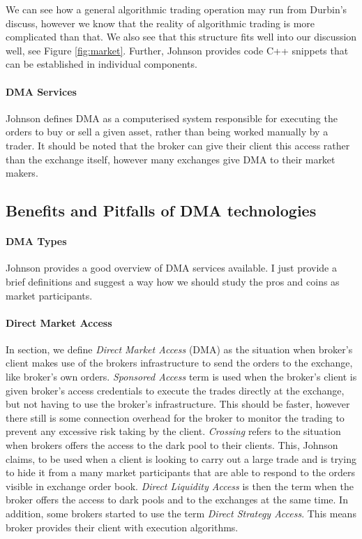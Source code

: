 \documentclass[12pt]{article}
\begin{document}
We can see how a general algorithmic trading operation may run from Durbin's discuss, however we know that the reality of algorithmic trading is more complicated than that. We also see that this structure fits well into our discussion well, see Figure \ref{fig:market}. Further, Johnson \cite{johnson} provides code C++ snippets that can be established in individual components.
\paragraph{DMA Services} Johnson \cite{johnson} defines DMA as a computerised system responsible for executing the orders to buy or sell a given asset, rather than being worked manually by a trader. It should be noted that the broker can give their client this access rather than the exchange itself, however many exchanges give DMA to their market makers.

\subsection*{Benefits and Pitfalls of DMA technologies}
\paragraph*{DMA Types} Johnson \cite{johnson} provides a good overview of DMA services available. I just provide a brief definitions and suggest a way how we should study the pros and coins as market participants.

\paragraph*{Direct Market Access} In section, we define \textit{Direct Market Access} (DMA) as the situation when broker's client makes use of the brokers infrastructure to send the orders to the exchange, like broker's own orders. \textit{Sponsored Access} term is used when the broker's client is given broker's access credentials to execute the trades directly at the exchange, but not having to use the broker's infrastructure. This should be faster, however there still is some connection overhead for the broker to monitor the trading to prevent any excessive risk taking by the client. \textit{Crossing} refers to the situation when brokers offers the access to the dark pool to their clients. This, Johnson claims, to be used when a client is looking to carry out a large trade and is trying to hide it from a many market participants that are able to respond to the orders visible in exchange order book. \textit{Direct Liquidity Access} is then the term when the broker offers the access to dark pools and to the exchanges at the same time. In addition, some brokers started to use the term \textit{Direct Strategy Access}. This means broker provides their client with execution algorithms.
\end{document}
